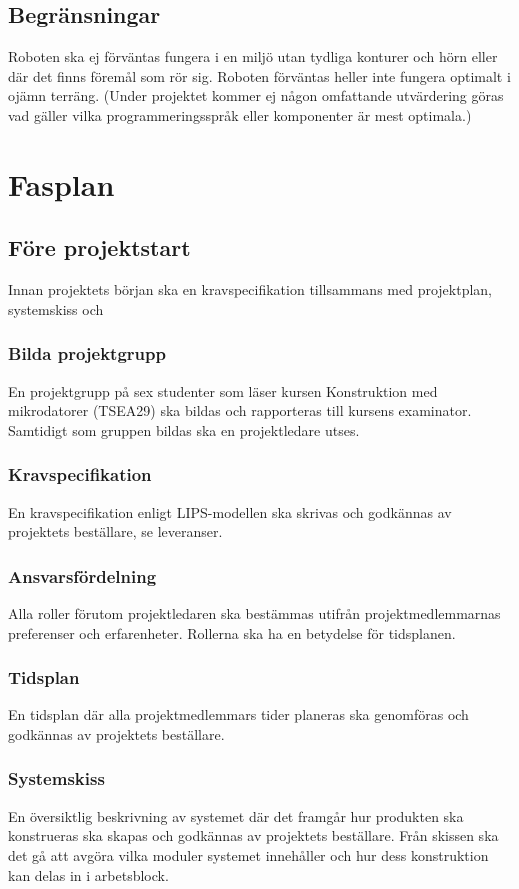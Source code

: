 \documentclass{article}
\begin{document}
\subsection{Begränsningar}
Roboten ska ej förväntas fungera i en miljö utan tydliga konturer och hörn eller där det finns föremål som rör sig. Roboten förväntas heller inte fungera optimalt i ojämn terräng. (Under projektet kommer ej någon omfattande utvärdering göras vad gäller vilka programmeringsspråk eller komponenter är mest optimala.)

\section{Fasplan}

\subsection{Före projektstart}
Innan projektets början ska en kravspecifikation tillsammans med projektplan, systemskiss och 

\subsubsection{Bilda projektgrupp}
En projektgrupp på sex studenter som läser kursen Konstruktion med mikrodatorer (TSEA29) ska bildas och rapporteras till kursens examinator. Samtidigt som gruppen bildas ska en projektledare utses.
   
\subsubsection{Kravspecifikation}
En kravspecifikation enligt LIPS-modellen ska skrivas och godkännas av projektets beställare, se leveranser.

\subsubsection{Ansvarsfördelning}
Alla roller förutom projektledaren ska bestämmas utifrån projektmedlemmarnas preferenser och erfarenheter. Rollerna ska ha en betydelse för tidsplanen.

\subsubsection{Tidsplan}
En tidsplan där alla projektmedlemmars tider planeras ska genomföras och godkännas av projektets beställare.

\subsubsection{Systemskiss}
En översiktlig beskrivning av systemet där det framgår hur produkten ska konstrueras ska skapas och godkännas av projektets beställare. Från skissen ska det gå att avgöra vilka moduler systemet innehåller och hur dess konstruktion kan delas in i arbetsblock.
\end{document}
